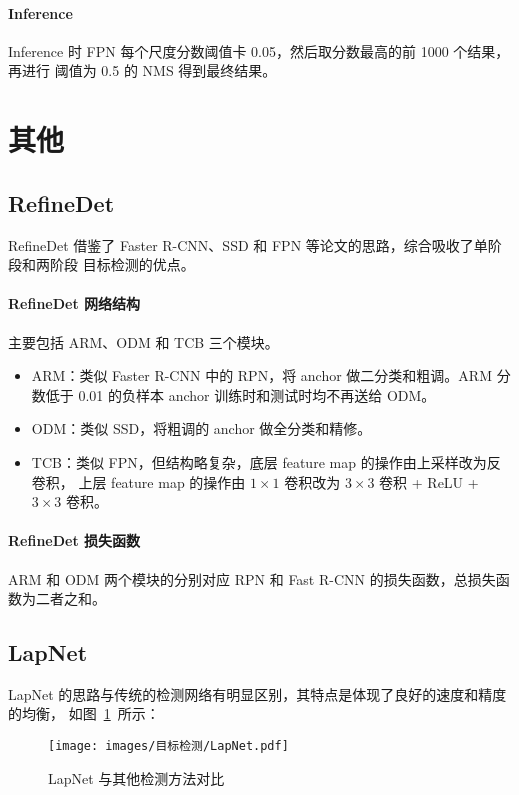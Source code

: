 \paragraph{Inference}
Inference 时 FPN 每个尺度分数阈值卡 0.05，然后取分数最高的前 1000 个结果，再进行
阈值为 0.5 的 NMS 得到最终结果。

\section{其他}

\subsection{RefineDet}
RefineDet 借鉴了 Faster R-CNN、SSD 和 FPN 等论文的思路，综合吸收了单阶段和两阶段
目标检测的优点。

\paragraph{RefineDet 网络结构}
主要包括 ARM、ODM 和 TCB 三个模块。
\begin{itemize}
  \item ARM：类似 Faster R-CNN 中的 RPN，将 anchor 做二分类和粗调。ARM 分数低于
    0.01 的负样本 anchor 训练时和测试时均不再送给 ODM。
  \item ODM：类似 SSD，将粗调的 anchor 做全分类和精修。
  \item TCB：类似 FPN，但结构略复杂，底层 feature map 的操作由上采样改为反卷积，
    上层 feature map 的操作由 $1 \times 1$ 卷积改为 $3 \times 3$ 卷积 + ReLU +
    $3 \times 3$ 卷积。
\end{itemize}

\paragraph{RefineDet 损失函数}
ARM 和 ODM 两个模块的分别对应 RPN 和 Fast R-CNN 的损失函数，总损失函数为二者之和。

\subsection{LapNet}
LapNet 的思路与传统的检测网络有明显区别，其特点是体现了良好的速度和精度的均衡，
如图~\ref{fig:LapNet}~所示：

\begin{figure}[ht]
  \centering
  \texttt{[image: images/目标检测/LapNet.pdf]}
  \caption{LapNet 与其他检测方法对比}
  \label{fig:LapNet}
\end{figure}

